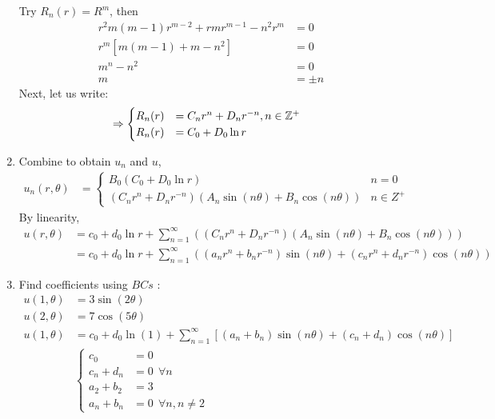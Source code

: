 \begin{enumerate}
  Try $R_n(r) = R^m$, then
  \begin{align}
    r^2 m( m - 1) r^{m - 2} + r mr^{m - 1} - n^2 r^m & = 0\\
    r^m \left[ m( m - 1) + m - n^2 \right] & = 0\\
    m^n - n^2 & = 0\\
    m & = \pm n
  \end{align}
  Next, let us write:
  \begin{align}
    & \Rightarrow
    \begin{cases}
      R_n(r) & = C_n r^n + D_n r^{-n}, n \in \mathbb Z^+\\
      R_n(r) & = C_0 + D_0 \ln r
    \end{cases}
  \end{align}
  \item Combine to obtain $u_n$ and $u$,
  \begin{align}
    u_n(r, \theta) & =
    \begin{cases}
      B_0(C_0 + D_0 \ln r) & n = 0\\
      (C_n r^n + D_n r^{-n})(A_n \sin(n \theta) + B_n \cos(n \theta)) & n \in Z^+
    \end{cases}
  \end{align}
  By linearity,
  \begin{align}
    u(r, \theta) & =
    c_0 + d_0 \ln r + \sum^\infty_{n = 1}
    \left(
    (C_n r^n + D_n r^{-n})(A_n \sin(n \theta) + B_n \cos(n \theta))
    \right)\\
    & =
    c_0 + d_0 \ln r + \sum^\infty_{n = 1}
    \left(
    (a_n r^n + b_n r^{-n})\sin(n \theta) + (c_n r^n + d_n r^{-n}) \cos(n \theta)
    \right)
  \end{align}
  \item Find coefficients using $BCs$ :
  \begin{align}
    u(1, \theta) & = 3 \sin(2 \theta)\\
    u(2, \theta) & = 7 \cos(5 \theta)\\
    u(1, \theta) & = c_0 + d_0 \ln(1) + \sum^\infty_{n = 1}
    \left[
    (a_n + b_n) \sin(n \theta) +
    (c_n + d_n) \cos(n \theta)
    \right]\\
    &
    \begin{cases}
      c_0       & = 0\ \           \\
      c_n + d_n & = 0\ \ \forall n \\
      a_2 + b_2 & = 3\ \           \\
      a_n + b_n & = 0\ \ \forall n, n \neq 2

\end{cases}
\end{align}
\end{enumerate}

